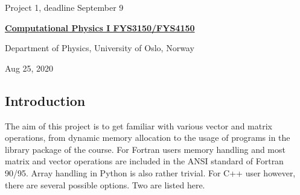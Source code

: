 \documentclass[%
oneside,                 %
final,                   %
10pt]{article}
\begin{document}

\newcommand{\exercisesection}[1]{\subsection*{#1}}






\thispagestyle{empty}

\begin{center}
{\LARGE\bf
\begin{spacing}{1.25}
Project 1, deadline  September 9
\end{spacing}
}
\end{center}


\begin{center}
{\bf \href{{http://www.uio.no/studier/emner/matnat/fys/FYS3150/index-eng.html}}{Computational Physics I FYS3150/FYS4150}}
\end{center}

    \begin{center}
\centerline{{\small Department of Physics, University of Oslo, Norway}}
\end{center}
    

\begin{center}
Aug 25, 2020
\end{center}

\vspace{1cm}


\subsection*{Introduction}
The aim of this project is to get familiar with various vector and matrix operations,
from dynamic memory allocation to the usage of programs in the library
package of the course. 
For Fortran users memory handling and most matrix and vector operations
are included in the ANSI standard of Fortran 90/95. Array handling in Python is also rather trivial. For C++ user however,
there are several possible options. Two are listed here.
\end{document}
